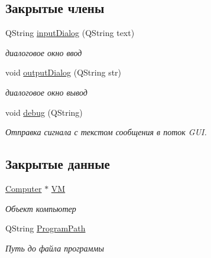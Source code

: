 \subsection*{Закрытые члены}
\begin{DoxyCompactItemize}
\item 
Q\+String \hyperlink{classinterpreter_a30d9b904383c7b73adceeca002461431}{input\+Dialog} (Q\+String text)
\begin{DoxyCompactList}\small\item\em диалоговое окно ввод \end{DoxyCompactList}\item 
void \hyperlink{classinterpreter_a5d3ba23a48b814586dabbe2e3507b93a}{output\+Dialog} (Q\+String str)
\begin{DoxyCompactList}\small\item\em диалоговое окно вывод \end{DoxyCompactList}\item 
void \hyperlink{classinterpreter_a5153712027e3e4344f72336f8b5cfa6d}{debug} (Q\+String)
\begin{DoxyCompactList}\small\item\em Отправка сигнала с текстом сообщения в поток G\+UI. \end{DoxyCompactList}\end{DoxyCompactItemize}
\subsection*{Закрытые данные}
\begin{DoxyCompactItemize}
\item 
\hypertarget{classinterpreter_a0b900e0016eab9306c6f70e93900fe09}{}\label{classinterpreter_a0b900e0016eab9306c6f70e93900fe09} 
\hyperlink{class_computer}{Computer} $\ast$ \hyperlink{classinterpreter_a0b900e0016eab9306c6f70e93900fe09}{VM}
\begin{DoxyCompactList}\small\item\em Объект компьютер \end{DoxyCompactList}\item 
\hypertarget{classinterpreter_acafdc7a0e329a4ed0f79930ed33f52be}{}\label{classinterpreter_acafdc7a0e329a4ed0f79930ed33f52be} 
Q\+String \hyperlink{classinterpreter_acafdc7a0e329a4ed0f79930ed33f52be}{Program\+Path}
\begin{DoxyCompactList}\small\item\em Путь до файла программы \end{DoxyCompactList}\end{DoxyCompactItemize}
